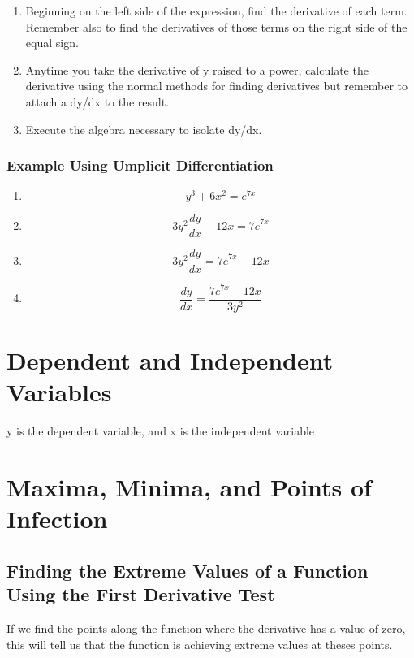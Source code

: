 \documentclass[a4paper,11pt]{book}
\begin{document}
\normalsize
\begin{enumerate}
  \item Beginning on the left side of the expression, find the derivative of each term. Remember also to find the derivatives of those terms on the right side of the equal sign.
  \item Anytime you take the derivative of y raised to a power, calculate the derivative using the normal methods for finding derivatives but remember to attach a dy/dx to the result.
  \item Execute the algebra necessary to isolate dy/dx.
\end{enumerate}

\subsubsection{Example Using Umplicit Differentiation}

\begin{enumerate}
\LARGE
  \item \[ y^3 + 6x^2 = {e}^{7x} \]
  \item \[ 3y^2\frac{dy}{dx} + 12x = {7e}^{7x} \]
  \item \[ 3y^2\frac{dy}{dx} = {7e}^{7x} - 12x \]
  \item \[ \frac{dy}{dx} = \frac{{7e}^{7x} - 12x}{3y^2} \]
\normalsize
\end{enumerate}

\section{Dependent and Independent Variables}
y is the dependent variable, and x is the independent variable








\section{Maxima, Minima, and Points of Infection}

\subsection{Finding the Extreme Values of a Function Using the First Derivative Test}

If we find the points along the function where the derivative has a value of zero, this will tell us that the function is achieving extreme values at theses points.
\end{document}
